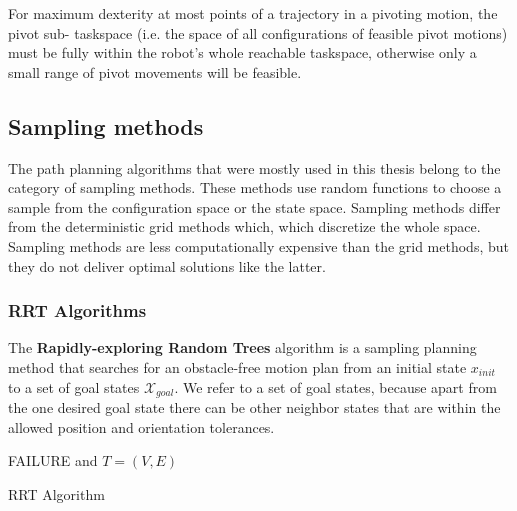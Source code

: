 For maximum dexterity at most points of a trajectory in a pivoting motion, the pivot sub-
taskspace (i.e. the space of all configurations of feasible pivot motions) must be fully within 
the robot’s whole reachable taskspace, otherwise only a small range of pivot movements will be 
feasible.



\subsection{Sampling methods}

The path planning algorithms that were mostly used in this thesis belong to the category of sampling methods. These methods use random functions to choose a sample from 
the configuration space or the state space. Sampling methods differ from the deterministic grid methods which, which discretize the whole space. Sampling methods are less 
computationally expensive than the grid methods, but they do not deliver optimal solutions like the latter.


\subsubsection{RRT Algorithms}

The \textbf{Rapidly-exploring Random Trees} algorithm is a sampling planning method that searches for an obstacle-free motion plan from an initial state $x_{init}$ to a set of goal states $\mathcal{X}_{goal}$. We refer to a set 
of goal states, because apart from the one desired goal state there can be other neighbor states that are within the allowed position and orientation tolerances.

\begin{algorithm}[H]
\SetAlgoLined
{}
\Return FAILURE and $ T=(V,E) $ \;
\caption{RRT Algorithm}
\end{algorithm}


